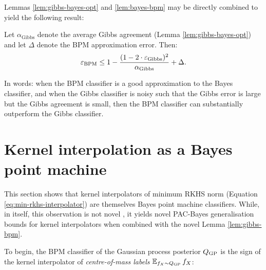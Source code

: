 \begin{refsection}
Lemmas \ref{lem:gibbs-bayes-opt} and \ref{lem:bayes-bpm} may be directly combined to yield the following result:

\begin{lemma}\label{lem:gibbs-bpm-opt}
    Let $\alpha_{\mathrm{Gibbs}}$ denote the average Gibbs agreement (Lemma \ref{lem:gibbs-bayes-opt}) and let $\Delta$ denote the BPM approximation error. Then:
    \begin{equation*}
        \varepsilon_{\mathrm{BPM}} \leq 1 - \frac{(1-2 \cdot \varepsilon_{\mathrm{Gibbs}})^2}{\alpha_{\mathrm{Gibbs}}} + \Delta.
    \end{equation*}
\end{lemma}
In words: when the BPM classifier is a good approximation to the Bayes classifier, and when the Gibbs classifier is noisy such that the Gibbs error is large but the Gibbs agreement is small, then the BPM classifier can substantially outperform the Gibbs classifier.

\section{Kernel interpolation as a Bayes point machine}
\label{sec:k-bpm}

This section shows that kernel interpolators of minimum RKHS norm (Equation \ref{eq:min-rkhs-interpolator}) are themselves Bayes point machine classifiers. While, in itself, this observation is not novel \citep{seeger}, it yields novel PAC-Bayes generalisation bounds for kernel interpolators when combined with the novel Lemma \ref{lem:gibbs-bpm}.

To begin, the BPM classifier of the Gaussian process posterior $Q_\mathrm{GP}$ is the sign of the kernel interpolator of \textit{centre-of-mass labels} $\operatorname{\mathbb{E}}_{f_X\sim Q_\mathrm{GP}}f_X$:


\end{refsection}
